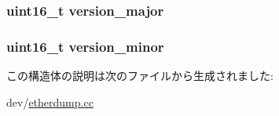 \label{structpcap__file__header_aeb4fa0ab3357f30ebf3be827f6757958}
\hypertarget{structpcap__file__header_ae45ca4ea27a897d2c46eb088e6b139f8}{
\subsubsection[{version\_\-major}]{\setlength{\rightskip}{0pt plus 5cm}uint16\_\-t {\bf version\_\-major}}}
\label{structpcap__file__header_ae45ca4ea27a897d2c46eb088e6b139f8}
\hypertarget{structpcap__file__header_a166f22ce4b25488997425405d2a6e42d}{
\subsubsection[{version\_\-minor}]{\setlength{\rightskip}{0pt plus 5cm}uint16\_\-t {\bf version\_\-minor}}}
\label{structpcap__file__header_a166f22ce4b25488997425405d2a6e42d}


この構造体の説明は次のファイルから生成されました:\begin{DoxyCompactItemize}
\item 
dev/\hyperlink{etherdump_8cc}{etherdump.cc}\end{DoxyCompactItemize}
